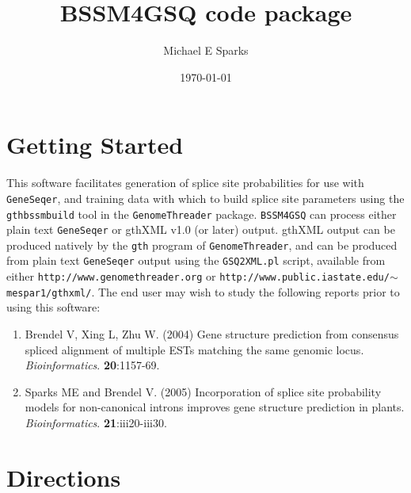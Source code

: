 \documentclass[11pt]{article}
\begin{document}

\title{BSSM4GSQ code package}
\author{Michael E Sparks}
\date{\today}
\maketitle

\section{Getting Started}
This software facilitates generation of splice site probabilities for
use with \texttt{GeneSeqer}, and training data with which to
build splice site parameters using the \texttt{gthbssmbuild}
tool in the \texttt{GenomeThreader} package.
\texttt{BSSM4GSQ} can process either plain text \texttt{GeneSeqer}
or gthXML v1.0 (or later) output.
gthXML output can be produced natively by the \texttt{gth}
program of \texttt{GenomeThreader}, and can be produced from plain text
\texttt{GeneSeqer} output using the \texttt{GSQ2XML.pl} script,
available from either \break
\texttt{http://www.genomethreader.org} or \break
\texttt{http://www.public.iastate.edu/$\sim$mespar1/gthxml/}.
The end user may wish to study the following reports prior to
using this software:
\begin{enumerate} 
  \item
  Brendel V, Xing L, Zhu W. (2004) Gene structure prediction from consensus
  spliced alignment of multiple ESTs matching the same genomic locus.
  \emph{Bioinformatics}. \textbf{20}:1157-69.
  \item
  Sparks ME and Brendel V. (2005) Incorporation of splice site probability models
  for non-canonical introns improves gene structure prediction in plants.
  \emph{Bioinformatics}. \textbf{21}:iii20-iii30.
\end{enumerate}

\section{Directions}
\end{document}
